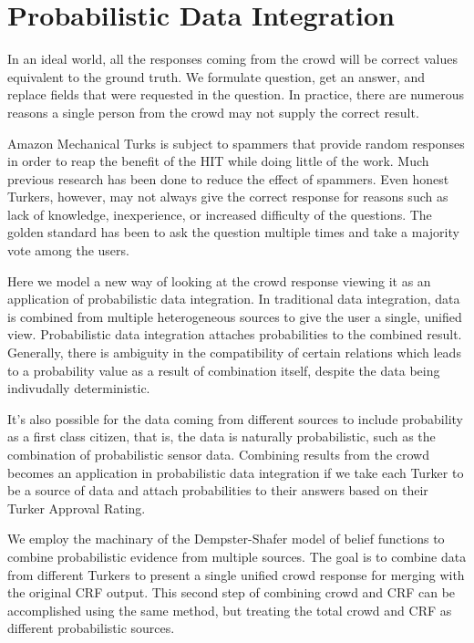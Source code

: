 \section{Probabilistic Data Integration}

In an ideal world, all the responses coming from the crowd will be correct values equivalent to the ground truth.  We formulate question, get an answer, and replace fields that were requested in the question.  In practice, there are numerous reasons a single person from the crowd may not supply the correct result.

Amazon Mechanical Turks is subject to spammers that provide random responses in order to reap the benefit of the HIT while doing little of the work.  Much previous research has been done to reduce the effect of spammers.  Even honest Turkers, however, may not always give the correct response for reasons such as lack of knowledge, inexperience, or increased difficulty of the questions.  The golden standard has been to ask the question multiple times and take a majority vote among the users. 

Here we model a new way of looking at the crowd response viewing it as an application of probabilistic data integration.  In traditional data integration, data is combined from multiple heterogeneous sources to give the user a single, unified view.  Probabilistic data integration attaches probabilities to the combined result.  Generally, there is ambiguity in the compatibility of certain relations which leads to a probability value as a result of combination itself, despite the data being indivudally deterministic.

It's also possible for the data coming from different sources to include probability as a first class citizen, that is, the data is naturally probabilistic, such as the combination of probabilistic sensor data.  Combining results from the crowd becomes an application in probabilistic data integration if we take each Turker to be a source of data and attach probabilities to their answers based on their Turker Approval Rating.  

We employ the machinary of the Dempster-Shafer model of belief functions to combine probabilistic evidence from multiple sources.  The goal is to combine data from different Turkers to present a single unified crowd response for merging with the original CRF output.  This second step of combining crowd and CRF can be accomplished using the same method, but treating the total crowd and CRF as different probabilistic sources.

